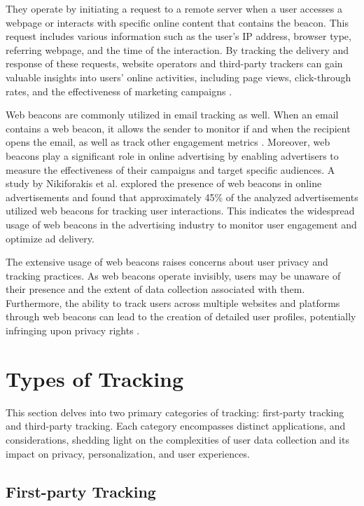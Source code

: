 They operate by initiating a request to a remote server when a user accesses a webpage
or interacts with specific online content that contains the beacon. This request includes various
information such as the user's IP address, browser type, referring webpage, and the time of
the interaction. By tracking the delivery and response of these requests, website operators
and third-party trackers can gain valuable insights into users' online activities,
including page views, click-through rates, and the effectiveness of marketing campaigns \cite{zimmer2010but}.

Web beacons are commonly utilized in email tracking as well. When an email contains a web beacon, it allows the sender to monitor
if and when the recipient opens the email, as well as track other engagement metrics \cite{gurses2011engineering}. 
Moreover, web beacons play a significant role in online advertising by enabling advertisers to measure the effectiveness
of their campaigns and target specific audiences. A study by Nikiforakis et al. \cite{nikiforakis2013cookieless}
explored the presence of web beacons in online advertisements and found that approximately 45\% of the analyzed advertisements
utilized web beacons for tracking user interactions. This indicates the widespread usage of web beacons in the advertising
industry to monitor user engagement and optimize ad delivery.

The extensive usage of web beacons raises concerns about user privacy and tracking practices. As web beacons operate invisibly,
users may be unaware of their presence and the extent of data collection associated with them. Furthermore, the ability to track
users across multiple websites and platforms through web beacons can lead to the creation of detailed user profiles,
potentially infringing upon privacy rights \cite{acquisti2015privacy}.

\section{Types of Tracking}
This section delves into two primary categories of tracking: first-party tracking and third-party tracking.
Each category encompasses distinct applications, and considerations, shedding light on the complexities
of user data collection and its impact on privacy, personalization, and user experiences.
\subsection{First-party Tracking}

